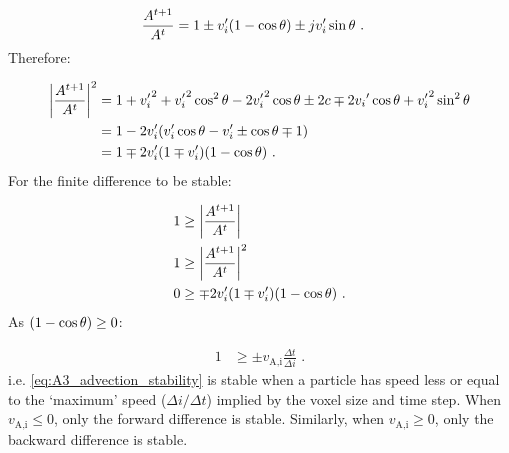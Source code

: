 \begin{equation}
    \begin{aligned}
    \frac{A^{t+1}}{A^t}&=1\pm v'_i\qty(1-\cos\theta)\pm jv'_i\sin\theta\text{ .} 
    \end{aligned}
\end{equation}
\noindent Therefore:

\begin{equation}
    \begin{aligned}
    \bigg| \frac{A^{t+1}}{A^t} \bigg|^2&=1+{v'_i}^2+{v'_i}^2\cos^2\theta - 2{v'_i}^2\cos\theta \pm 2c \mp 2{v_i}'\cos\theta + {v'_i}^2\sin^2\theta \\
    &=1-2v'_i\qty(v'_i\cos\theta -v'_i\pm \cos\theta \mp 1) \\
    &=1\mp 2v'_i\qty(1\mp v'_i)\qty(1-\cos\theta)\text{ .} 
    \end{aligned}
\end{equation}
\noindent For the finite difference to be stable:

\begin{equation}
    \begin{aligned}
    1&\geq \bigg| \frac{A^{t+1}}{A^t} \bigg|\\
    1&\geq\bigg| \frac{A^{t+1}}{A^t} \bigg|^2\\
    0&\geq \mp 2v'_i\qty(1\mp v_i')\qty(1-\cos\theta)\text{ .} 
    \end{aligned}
\end{equation}
\noindent As $\qty(1-\cos\theta)\geq 0$:

\begin{equation}
    \begin{aligned}
    1&\geq \pm v_\text{A,i}\frac{\Delta t}{\Delta i}\text{ .} 
    \end{aligned} \label{eq:A3_advection_stability}
\end{equation}
\noindent i.e. \autoref{eq:A3_advection_stability} is stable when a particle has speed less or equal to the `maximum' speed ($\Delta i/\Delta t$) implied by the voxel size and time step. When $v_\text{A,i}\leq 0$, only the forward difference is stable. Similarly, when $v_\text{A,i}\geq 0$, only the backward difference is stable.